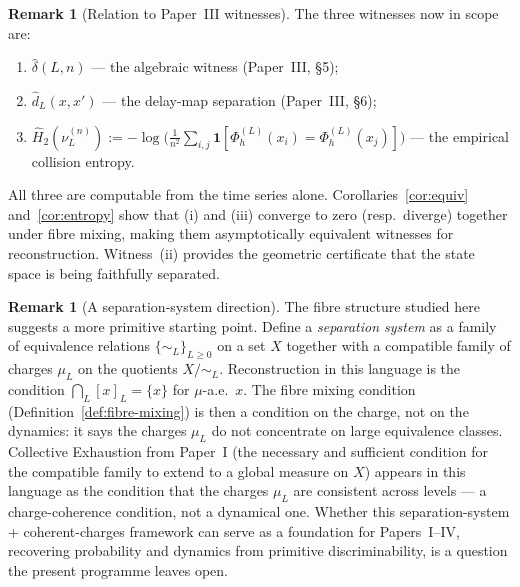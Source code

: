 \documentclass[11pt]{article}
\theoremstyle{definition}
\newtheorem{remark}[theorem]{Remark}
\newcommand{\PhiL}{\Phi_h^{(L)}}
\begin{document}
\begin{remark}[Relation to Paper~III witnesses]
The three witnesses now in scope are:
\begin{enumerate}[label=(\roman*)]
  \item $\hat\delta(L,n)$ --- the algebraic witness (Paper~III, \S5);
  \item $\hat d_L(x,x')$ --- the delay-map separation (Paper~III, \S6);
  \item $\hat H_2(\nu_L^{(n)}) := -\log\bigl(\frac{1}{n^2}\sum_{i,j}
        \mathbf{1}[\PhiL(x_i) = \PhiL(x_j)]\bigr)$ --- the empirical
        collision entropy.
\end{enumerate}
All three are computable from the time series alone.
Corollaries~\ref{cor:equiv} and~\ref{cor:entropy} show that (i) and (iii)
converge to zero (resp.\ diverge) together under fibre mixing,
making them asymptotically equivalent witnesses for reconstruction.
Witness~(ii) provides the geometric certificate that the state space is
being faithfully separated.
\end{remark}

\begin{remark}[A separation-system direction]
\label{rem:paper-zero}
The fibre structure studied here suggests a more primitive starting point.
Define a \emph{separation system} as a family of equivalence relations
$\{\sim_L\}_{L \geq 0}$ on a set $X$ together with a compatible family of
charges $\mu_L$ on the quotients $X/{\sim_L}$.
Reconstruction in this language is the condition $\bigcap_L [x]_L = \{x\}$
for $\mu$-a.e.\ $x$.
The fibre mixing condition (Definition~\ref{def:fibre-mixing}) is then a
condition on the charge, not on the dynamics: it says the charges $\mu_L$ do
not concentrate on large equivalence classes.
Collective Exhaustion from Paper~I (the necessary and sufficient condition for
the compatible family to extend to a global measure on $X$) appears in this
language as the condition that the charges $\mu_L$ are consistent across levels
--- a charge-coherence condition, not a dynamical one.
Whether this separation-system + coherent-charges framework can serve as a
foundation for Papers~I--IV, recovering probability and dynamics from
primitive discriminability, is a question the present programme leaves open.
\end{remark}
\end{document}
